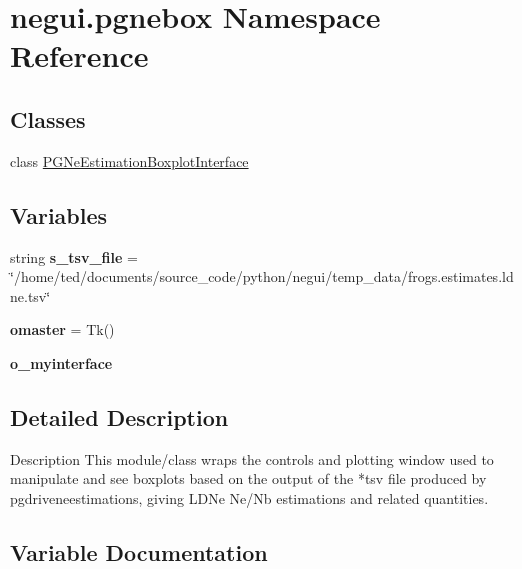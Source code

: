 \hypertarget{namespacenegui_1_1pgnebox}{}\section{negui.\+pgnebox Namespace Reference}
\label{namespacenegui_1_1pgnebox}
\subsection*{Classes}
\begin{DoxyCompactItemize}
\item 
class \hyperlink{classnegui_1_1pgnebox_1_1PGNeEstimationBoxplotInterface}{P\+G\+Ne\+Estimation\+Boxplot\+Interface}
\end{DoxyCompactItemize}
\subsection*{Variables}
\begin{DoxyCompactItemize}
\item 
string {\bfseries s\+\_\+tsv\+\_\+file} = \char`\"{}/home/ted/documents/source\+\_\+code/python/negui/temp\+\_\+data/frogs.\+estimates.\+ldne.\+tsv\char`\"{}\hypertarget{namespacenegui_1_1pgnebox_a2d3f4fbcc2db5ab37fd7a88660e8c9e3}{}\label{namespacenegui_1_1pgnebox_a2d3f4fbcc2db5ab37fd7a88660e8c9e3}

\item 
{\bfseries omaster} = Tk()\hypertarget{namespacenegui_1_1pgnebox_aaf3b8ef1623da271624c6e1343113def}{}\label{namespacenegui_1_1pgnebox_aaf3b8ef1623da271624c6e1343113def}

\item 
{\bfseries o\+\_\+myinterface}
\end{DoxyCompactItemize}


\subsection{Detailed Description}
\begin{DoxyVerb}Description
This module/class wraps the controls and plotting
window used to manipulate and see boxplots
based on the output of the *tsv file produced
by pgdriveneestimations, giving LDNe Ne/Nb 
estimations and related quantities.
\end{DoxyVerb}
 

\subsection{Variable Documentation}
